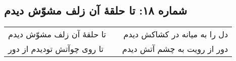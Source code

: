 \begin{center}
\section*{شماره ۱۸: تا حلقۀ آن زلف مشوّش دیدم}
\label{sec:018}
\begin{longtable}{l p{0.5cm} r}
تا حلقهٔ آن زلف مشوّش دیدم
&&
دل را به میانه در کشاکش دیدم
\\
تا روی چوآتش تودیدم از دور
&&
دور از رویت به چشم آتش دیدم
\\
\end{longtable}
\end{center}
